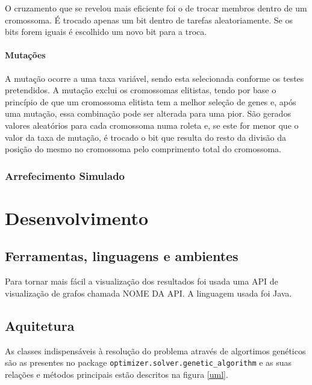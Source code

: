 \begin{titlepage}
O cruzamento que se revelou mais eficiente foi o de trocar membros dentro de um cromossoma. É trocado apenas um bit dentro de tarefas aleatoriamente. Se os bits forem iguais é escolhido um novo bit para a troca.

\paragraph{Mutações}

A mutação ocorre a uma taxa variável, sendo esta selecionada conforme os testes pretendidos. A mutação exclui os cromossomas elitistas, tendo por base o princípio de que um cromossoma elitista tem a melhor seleção de genes e, após uma mutação, essa combinação pode ser alterada para uma pior. São gerados valores aleatórios para cada cromossoma numa roleta e, se este for menor que o valor da taxa de mutação, é trocado o bit que resulta do resto da divisão da posição do mesmo no cromossoma pelo comprimento total do cromossoma.


\subsubsection{Arrefecimento Simulado}
\justify\normalsize


\section{Desenvolvimento}

\subsection{Ferramentas, linguagens e ambientes}
\justify\normalsize
Para tornar mais fácil a visualização dos resultados foi usada uma API de visualização de grafos chamada NOME DA API. A linguagem usada foi Java.

\subsection{Aquitetura}
\justify\normalsize
As classes indispensáveis à resolução do problema através de algortimos genéticos são as presentes no package \texttt{optimizer.solver.genetic\_algorithm} e as suas relações e métodos principais estão descritos na figura \ref{uml}.


\end{titlepage}
